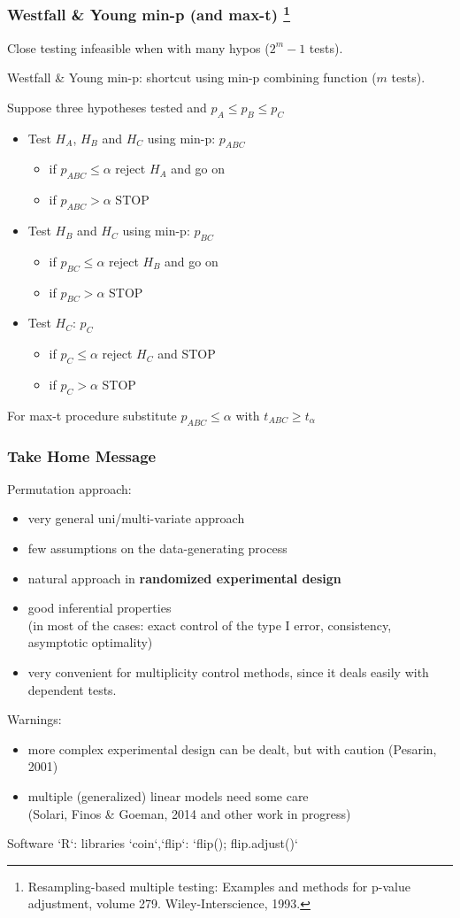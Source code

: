 \documentclass[xcolor={pdftex,dvipsnames,table}]{beamer}
\newcommand{\bi}{\begin {itemize}}
\newcommand{\ei}{\end{itemize}}
\newcommand{\bfr}[1]{\begin{frame} \frametitle{#1}}
\begin{document}
\begin{frame}
\frametitle{Westfall \& Young min-p (and max-t) \footnote{
Resampling-based multiple testing: Examples and methods for p-value
adjustment, volume 279. Wiley-Interscience, 1993.}}

Close testing infeasible when with many hypos ($2^m-1$ tests).

Westfall \& Young min-p: shortcut using min-p combining function ($m$ tests).
\pause

Suppose three hypotheses tested and $p_A\leq p_B \leq p_C$

\bi
  \item Test $H_A$, $H_B$ and $H_C$ using min-p: $p_{ABC}$
    \bi 
      \item if $p_{ABC}\leq\alpha$ reject $H_A$ and go on
      \item if $p_{ABC}>\alpha$ STOP
    \ei
  \item Test $H_B$ and $H_C$ using min-p: $p_{BC}$
    \bi 
      \item if $p_{BC}\leq\alpha$ reject $H_B$ and go on
      \item if $p_{BC}>\alpha$ STOP
    \ei
  \item Test $H_C$: $p_{C}$
    \bi 
      \item if $p_{C}\leq\alpha$ reject $H_C$ and STOP
      \item if $p_{C}>\alpha$ STOP
    \ei
\ei

For max-t procedure substitute $p_{ABC}\leq\alpha$  with $t_{ABC}\geq t_\alpha$

\end{frame} 

\bfr{Take Home Message}
Permutation approach:
\bi
\item very general uni/multi-variate approach
\item few assumptions on the data-generating process
\item natural approach in {\bf  randomized experimental design}
\item good inferential properties\\ (in most of the cases: exact control of the type I error, consistency, asymptotic optimality)
\item very convenient for multiplicity control methods, since it deals easily with dependent tests.
\ei
Warnings:
\bi
\item more complex experimental design can be dealt, but with caution (Pesarin, 2001) 
\item multiple (generalized) linear models need some care\\ (Solari, Finos \& Goeman, 2014 and other work in progress)
\ei
Software `R`: libraries `coin`,`flip`: `flip(); flip.adjust()`
\end{frame}
\end{document}
